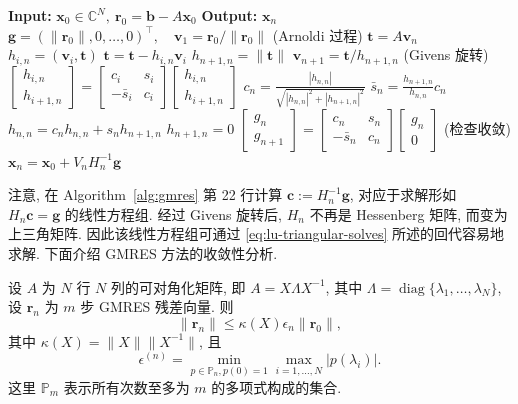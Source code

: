 \begin{algorithm}[H]\caption{{改进 Gram-Schmidt 型 GMRES 方法}}\label{alg:gmres}\begin{algorithmic}[1]
\Statex\textbf{Input:} $\bm x_0\in\mathbb C^N,\ \bm r_0=\bm b-A\bm x_0$
\Statex\textbf{Output:} $\bm x_n$
\State $\bm g=(\|\bm r_0\|,0,\ldots,0)^{\top},\quad\bm v_1=\bm r_0/\|\bm r_0\|$
\State (Arnoldi {过程})
\State $\bm t=A\bm v_n$
\State $h_{i,n}=(\bm v_i,\bm t)$
\State $\bm t=\bm t-h_{i,n}\bm v_i$
\EndFor
\State $h_{n+1,n}=\|\bm t\|$
\State $\bm v_{n+1}=\bm t/h_{n+1,n}$
\State (Givens {旋转})
\State $\begin{bmatrix}h_{i,n}\\h_{i+1,n}\end{bmatrix}=\begin{bmatrix}c_i&s_i\\-\bar s_i&c_i\end{bmatrix}\begin{bmatrix}h_{i,n}\\h_{i+1,n}\end{bmatrix}$
\EndFor
\State $c_n=\frac{|h_{n,n}|}{\sqrt{|h_{n,n}|^2+|h_{n+1,n}|^2}}$
\State $\bar s_n=\frac{h_{n+1,n}}{h_{n,n}}c_n$
\State $h_{n,n}=c_nh_{n,n}+s_nh_{n+1,n}$
\State $h_{n+1,n}=0$
\State $\begin{bmatrix}g_n\\g_{n+1}\end{bmatrix}=\begin{bmatrix}c_n&s_n\\-\bar s_n&c_n\end{bmatrix}\begin{bmatrix}g_n\\0\end{bmatrix}$
\State ({检查收敛})
\State $\bm x_n=\bm x_0+V_nH_n^{-1}\bm g$
\EndIf\EndFor\end{algorithmic}\end{algorithm}
{注意, 在 Algorithm\ \ref{alg:gmres} 第 22 行计算 $\bm c:=H_n^{-1}\bm g$, 对应于求解形如 $H_n\bm c=\bm g$ 的线性方程组. 经过 Givens 旋转后, $H_n$ 不再是 Hessenberg 矩阵, 而变为上三角矩阵. 因此该线性方程组可通过 \eqref{eq:lu-triangular-solves} 所述的回代容易地求解.}
{下面介绍 GMRES 方法的收敛性分析.}
\par{}
\begin{Proposition}\label{prop:gmres-diagonalizable-bound}
{设 $A$ 为 $N$ 行 $N$ 列的可对角化矩阵, 即 $A=X\Lambda X^{-1}$, 其中 $\Lambda=\operatorname{diag}\{\lambda_1,\ldots,\lambda_N\}$, 设 $\bm r_n$ 为 $m$ 步 GMRES 残差向量. 则}
\[\|\bm r_n\|\le\kappa(X)\epsilon_n\|\bm r_0\|,\]
{其中 $\kappa(X)=\|X\|\|X^{-1}\|$, 且}
\[\epsilon^{(n)}=\min_{p\in\mathbb P_n,p(0)=1}\max_{i=1,\ldots,N}|p(\lambda_i)|.\]
{这里 $\mathbb P_m$ 表示所有次数至多为 $m$ 的多项式构成的集合.}
\end{Proposition}
